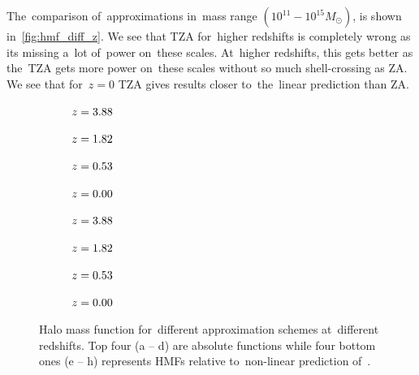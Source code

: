 The~comparison of~approximations in~mass range $(10^{11}-10^{15}M_\odot)$, is shown in~\autoref{fig:hmf_diff_z}. We see that TZA for~higher redshifts is completely wrong as its missing a~lot of~power on~these scales. At~higher redshifts, this gets better as the~TZA gets more power on~these scales without so much shell-crossing as ZA. We see that for~$z=0$ TZA gives results closer to~the~linear prediction than ZA.
\begin{figure}[p]
	\centering
	\begin{subfigure}{1.0\textwidth}
	\end{subfigure}
	\begin{subfigure}{0.5\textwidth}
		\caption{$z=3.88$}
	\end{subfigure}
	\begin{subfigure}{0.5\textwidth}
		\caption{$z=1.82$}
	\end{subfigure}
	\begin{subfigure}{0.5\textwidth}
		\caption{$z=0.53$}
	\end{subfigure}
	\begin{subfigure}{0.5\textwidth}
		\caption{$z=0.00$}
	\end{subfigure}
	\begin{subfigure}{0.5\textwidth}
		\caption{$z=3.88$}
	\end{subfigure}
	\begin{subfigure}{0.5\textwidth}
		\caption{$z=1.82$}
	\end{subfigure}
	\begin{subfigure}{0.5\textwidth}
		\caption{$z=0.53$}
	\end{subfigure}
	\begin{subfigure}{0.5\textwidth}
		\caption{$z=0.00$}
	\end{subfigure}
	\caption{Halo mass function for~different approximation schemes at~different redshifts. Top four (a -- d) are absolute functions while four bottom ones (e -- h) represents HMFs relative to~non-linear prediction of~\LCDM.}
	\label{fig:hmf_diff_z}
\end{figure}

